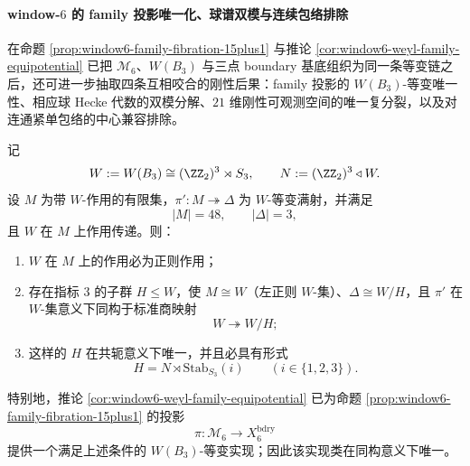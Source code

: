 \paragraph{window-\(6\) 的 family 投影唯一化、球谱双模与连续包络排除}
在命题 \ref{prop:window6-family-fibration-15plus1} 与推论 \ref{cor:window6-weyl-family-equipotential} 已把
\(\mathcal M_6\)、\(W(B_3)\) 与三点 boundary 基底组织为同一条等变链之后，还可进一步抽取四条互相咬合的刚性后果：family 投影的 \(W(B_3)\)-等变唯一性、相应球 Hecke 代数的双模分解、\(21\) 维刚性可观测空间的唯一复分裂，以及对连通紧单包络的中心兼容排除。

\begin{theorem}\label{thm:window6-family-projection-wequivariant-uniqueness}
记
\[
W:=W(B_3)\cong (\ZZ_2)^3\rtimes S_3,
\qquad
N:=(\ZZ_2)^3\triangleleft W.
\]
设 \(M\) 为带 \(W\)-作用的有限集，\(\pi':M\twoheadrightarrow \Delta\) 为 \(W\)-等变满射，并满足
\[
|M|=48,
\qquad
|\Delta|=3,
\]
且 \(W\) 在 \(M\) 上作用传递。则：
\begin{enumerate}
  \item \(W\) 在 \(M\) 上的作用必为正则作用；
  \item 存在指标 \(3\) 的子群 \(H\le W\)，使 \(M\cong W\)（左正则 \(W\)-集）、\(\Delta\cong W/H\)，且 \(\pi'\) 在 \(W\)-集意义下同构于标准商映射
  \[
  W\twoheadrightarrow W/H;
  \]
  \item 这样的 \(H\) 在共轭意义下唯一，并且必具有形式
  \[
  H=N\rtimes \mathrm{Stab}_{S_3}(i)
  \qquad (i\in\{1,2,3\}).
  \]
\end{enumerate}
特别地，推论 \ref{cor:window6-weyl-family-equipotential} 已为命题 \ref{prop:window6-family-fibration-15plus1} 的投影
\[
\pi:\mathcal M_6\longrightarrow X_6^{\mathrm{bdry}}
\]
提供一个满足上述条件的 \(W(B_3)\)-等变实现；因此该实现类在同构意义下唯一。
\end{theorem}
